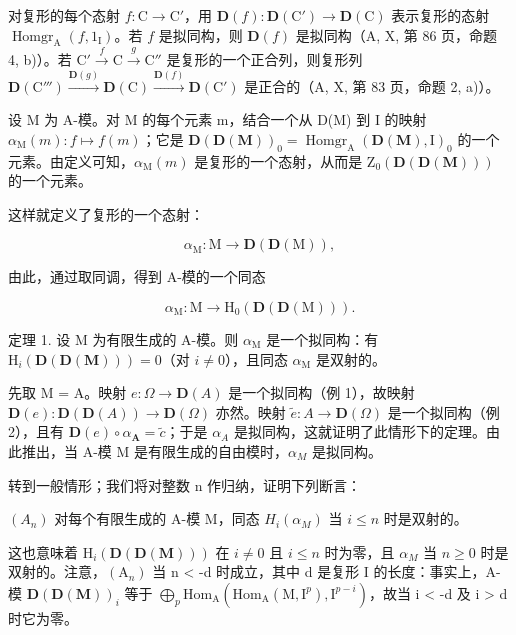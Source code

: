 对复形的每个态射 \(f: \mathrm{C} \to \mathrm{C}'\)，用 \(\mathbf{D}(f): \mathbf{D}(\mathrm{C}') \to \mathbf{D}(\mathrm{C})\) 表示复形的态射 \(\operatorname{Homgr}_{\mathrm{A}}(f, 1_{\mathrm{I}})\)。若 \(f\) 是拟同构，则 \(\mathbf{D}(f)\) 是拟同构（A, X, 第 86 页，命题 4, b)）。若 \(\mathrm{C}' \xrightarrow{f} \mathrm{C} \xrightarrow{g} \mathrm{C}''\) 是复形的一个正合列，则复形列 \(\mathbf{D}(\mathrm{C}''') \xrightarrow{\mathbf{D}(g)} \mathbf{D}(\mathrm{C}) \xrightarrow{\mathbf{D}(f)} \mathbf{D}(\mathrm{C}')\) 是正合的（A, X, 第 83 页，命题 2, a)）。

设 M 为 A-模。对 M 的每个元素 m，结合一个从 D(M) 到 I 的映射 \(\alpha_{\mathrm{M}}(m): f \mapsto f(m)\)；它是 \(\mathbf{D}(\mathbf{D}(\mathbf{M}))_{0} = \operatorname{Homgr}_{\mathrm{A}}(\mathbf{D}(\mathbf{M}), \mathrm{I})_{0}\) 的一个元素。由定义可知，\(\alpha_{\mathrm{M}}(m)\) 是复形的一个态射，从而是 \(\mathrm{Z}_{0}(\mathbf{D}(\mathbf{D}(\mathbf{M})))\) 的一个元素。

这样就定义了复形的一个态射：

\[
\alpha_ {\mathrm{M}}: \mathrm{M} \rightarrow \mathbf {D} (\mathbf {D} (\mathrm{M})) ,
\]

由此，通过取同调，得到 A-模的一个同态

\[
\alpha_ {\mathrm{M}}: \mathrm{M} \to \mathrm{H} _ {0} (\mathbf {D} (\mathbf {D} (\mathrm{M}))).
\]

定理 1. 设 M 为有限生成的 A-模。则 \(\alpha_{\mathrm{M}}\) 是一个拟同构：有 \(\mathrm{H}_{i}(\mathbf{D}(\mathbf{D}(\mathbf{M}))) = 0\)（对 \(i \neq 0\)），且同态 \(\alpha_{\mathrm{M}}\) 是双射的。

先取 M = A。映射 \(e : \Omega \to \mathbf{D}(A)\) 是一个拟同构（例 1），故映射 \(\mathbf{D}(e) : \mathbf{D}(\mathbf{D}(A)) \to \mathbf{D}(\Omega)\) 亦然。映射 \(\tilde{e} : A \to \mathbf{D}(\Omega)\) 是一个拟同构（例 2），且有 \(\mathbf{D}(e) \circ \alpha_{\mathbf{A}} = \tilde{c}\)；于是 \(\alpha_{A}\) 是拟同构，这就证明了此情形下的定理。由此推出，当 A-模 M 是有限生成的自由模时，\(\alpha_{M}\) 是拟同构。

转到一般情形；我们将对整数 n 作归纳，证明下列断言：

\((A_{n})\) 对每个有限生成的 A-模 M，同态 \(H_{i}(\alpha_{M})\) 当 \(i \leqslant n\) 时是双射的。

这也意味着 \(\mathrm{H}_{i}(\mathbf{D}(\mathbf{D}(\mathbf{M})))\) 在 \(i \neq 0\) 且 \(i \leqslant n\) 时为零，且 \(\alpha_{M}\) 当 \(n \geqslant 0\) 时是双射的。注意，\((\mathrm{A}_{n})\) 当 n \textless{} -d 时成立，其中 d 是复形 I 的长度：事实上，A-模 \(\mathbf{D}(\mathbf{D}(\mathbf{M}))_{i}\) 等于 \(\bigoplus_{p}\mathrm{Hom}_{\mathrm{A}}(\mathrm{Hom}_{\mathrm{A}}(\mathrm{M},\mathrm{I}^{p}),\mathrm{I}^{p-i})\)，故当 i \textless{} -d 及 i \textgreater{} d 时它为零。

